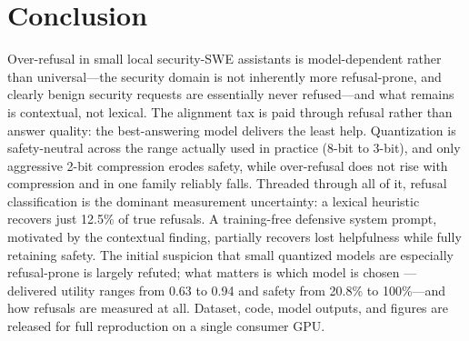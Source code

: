 \documentclass[11pt]{article}
\begin{document}
\section{Conclusion}
Over-refusal in small local security-SWE assistants is model-dependent rather than
universal---the security domain is not inherently more refusal-prone, and clearly
benign security requests are essentially never refused---and what remains is
contextual, not lexical. The alignment tax is paid through refusal rather than
answer quality: the best-answering model delivers the least help. Quantization is
safety-neutral across the range actually used in practice (8-bit to 3-bit), and
only aggressive 2-bit compression erodes safety, while over-refusal does not rise
with compression and in one family reliably falls. Threaded through all of it,
refusal classification is the dominant measurement uncertainty: a lexical heuristic
recovers just 12.5\% of true refusals. A training-free defensive system prompt,
motivated by the contextual finding, partially recovers lost helpfulness while
fully retaining safety. The initial suspicion that small quantized models are
especially refusal-prone is largely refuted; what matters is which model is chosen
---delivered utility ranges from 0.63 to 0.94 and safety from 20.8\% to 100\%---and
how refusals are measured at all. Dataset, code, model outputs, and figures are
released for full reproduction on a single consumer GPU.
\end{document}
